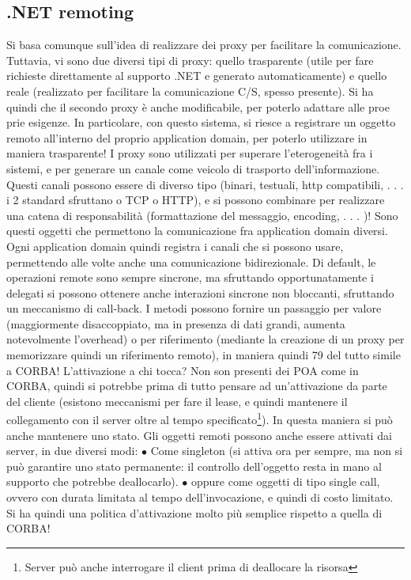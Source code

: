 \subsection{.NET remoting}
Si basa comunque sull'idea di realizzare dei proxy per facilitare la comunicazione.
Tuttavia, vi sono due diversi tipi di proxy: quello trasparente (utile per fare
richieste direttamente al supporto .NET e generato automaticamente) e quello
reale (realizzato per facilitare la comunicazione C/S, spesso presente). Si ha
quindi che il secondo proxy è anche modificabile, per poterlo adattare alle proe
prie esigenze. In particolare, con questo sistema, si riesce a registrare un oggetto remoto all'interno del proprio
application domain, per poterlo utilizzare in
maniera trasparente!
I proxy sono utilizzati per superare l'eterogeneità fra i sistemi, e per generare
un canale come veicolo di trasporto dell'informazione. Questi canali possono essere di diverso tipo (binari, testuali,
http compatibili, . . . i 2 standard sfruttano
o TCP o HTTP), e si possono combinare per realizzare una catena di responsabilità (formattazione del messaggio,
encoding, . . . )! Sono questi oggetti che
permettono la comunicazione fra application domain diversi. Ogni application
domain quindi registra i canali che si possono usare, permettendo alle volte anche una comunicazione bidirezionale.
Di default, le operazioni remote sono sempre sincrone, ma sfruttando opportunatamente i delegati si possono ottenere
anche interazioni sincrone non
bloccanti, sfruttando un meccanismo di call-back. I metodi possono fornire un
passaggio per valore (maggiormente disaccoppiato, ma in presenza di dati grandi, aumenta notevolmente l'overhead) o per
riferimento (mediante la creazione
di un proxy per memorizzare quindi un riferimento remoto), in maniera quindi
79
del tutto simile a CORBA!
L'attivazione a chi tocca? Non son presenti dei POA come in CORBA,
quindi si potrebbe prima di tutto pensare ad un'attivazione da parte del cliente
(esistono meccanismi per fare il lease, e quindi mantenere il collegamento con il
server oltre al tempo specificato\footnote{Server può anche interrogare il client prima di deallocare la risorsa}). In
questa maniera si può anche mantenere
uno stato.
Gli oggetti remoti possono anche essere attivati dai server, in due diversi
modi:
$\bullet$ Come singleton (si attiva ora per sempre, ma non si può garantire uno
stato permanente: il controllo dell'oggetto resta in mano al supporto che
potrebbe deallocarlo).
$\bullet$ oppure come oggetti di tipo single call, ovvero con durata limitata al tempo
dell'invocazione, e quindi di costo limitato.
Si ha quindi una politica d'attivazione molto più semplice rispetto a quella di
CORBA!